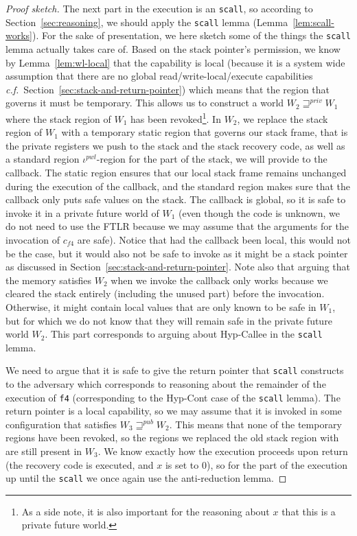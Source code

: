 \documentclass[format=acmsmall, review=true, screen=true]{acmart}
\renewcommand{\sectionname}{Section}
\newcommand{\var}[1]{\mathit{#1}}
\newcommand{\futurewk}{\mathbin{\sqsupseteq}^{\var{pub}}}
\newcommand{\futurestr}{\mathbin{\sqsupseteq}^{\var{priv}}}
\newenvironment{toplas}{}{}
\begin{document}
\begin{toplas}
\begin{proof}[Proof sketch]
  The next part in the execution is an \texttt{scall}, so according to \sectionname~\ref{sec:reasoning}, we should apply the \texttt{scall} lemma (Lemma~\ref{lem:scall-works}).
  For the sake of presentation, we here sketch some of the things the \texttt{scall} lemma actually takes care of.
  Based on the stack pointer's permission, we know by Lemma~\ref{lem:wl-local} that the capability is local (because it is a system wide assumption that there are no global read/write-local/execute capabilities \textit{c.f.}\ \sectionname~\ref{sec:stack-and-return-pointer}) which means that the region that governs it must be temporary.
  This allows us to construct a world $W_2 \futurestr W_1$ where the stack region of $W_1$ has been revoked\footnote{As a side note, it is also important for the reasoning about $x$ that this is a private future world.}.
  In $W_2$, we replace the stack region of $W_1$ with a temporary static region that governs our stack frame, that is the private registers we push to the stack and the stack recovery code, as well as a standard region $\iota^{pwl}$-region for the part of the stack, we will provide to the callback.
  The static region ensures that our local stack frame remains unchanged during the execution of the callback, and the standard region makes sure that the callback only puts safe values on the stack.
  The callback is global, so it is safe to invoke it in a private future world of $W_1$ (even though the code is unknown, we do not need to use the FTLR because we may assume that the arguments for the invocation of $c_{f4}$ are safe).
  Notice that had the callback been local, this would not be the case, but it would also not be safe to invoke as it might be a stack pointer as discussed in \sectionname~\ref{sec:stack-and-return-pointer}.
  Note also that arguing that the memory satisfies $W_2$ when we invoke the callback only works because we cleared the stack entirely (including the unused part) before the invocation.
  Otherwise, it might contain local values that are only known to be safe in $W_1$, but for which we do not know that they will remain safe in the private future world $W_2$.
  This part corresponds to arguing about Hyp-Callee in the \texttt{scall} lemma.

  We need to argue that it is safe to give the return pointer that \texttt{scall} constructs to the adversary which corresponds to reasoning about the remainder of the execution of \texttt{f4} (corresponding to the Hyp-Cont case of the \texttt{scall} lemma).
  The return pointer is a local capability, so we may assume that it is invoked in some configuration that satisfies $W_3 \futurewk W_2$.
  This means that none of the temporary regions have been revoked, so the regions we replaced the old stack region with are still present in $W_3$.
  We know exactly how the execution proceeds upon return (the recovery code is executed, and $x$ is set to 0), so for the part of the execution up until the \texttt{scall} we once again use the anti-reduction lemma.
  

\end{proof}
\end{toplas}
\end{document}
